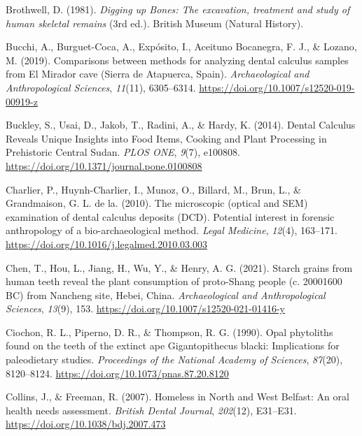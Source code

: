 \documentclass[
  b5paper,
]{book}
\newlength{\cslhangindent}
\newlength{\cslentryspacingunit} %
\newenvironment{CSLReferences}[2] %
 {%
  \setlength{\parindent}{0pt}
  \ifodd #1
  \let\oldpar\par
  \def\par{\hangindent=\cslhangindent\oldpar}
  \fi
  \setlength{\parskip}{#2\cslentryspacingunit}
 }%
 {}
\begin{document}
\begin{CSLReferences}{1}{0}
\leavevmode{}%
Brothwell, D. (1981). \emph{Digging up {Bones}: {The} excavation,
treatment and study of human skeletal remains} (3rd ed.). {British
Museum (Natural History)}.

\leavevmode{}%
Bucchi, A., Burguet-Coca, A., Expósito, I., Aceituno Bocanegra, F. J.,
\& Lozano, M. (2019). Comparisons between methods for analyzing dental
calculus samples from {El Mirador} cave ({Sierra} de {Atapuerca},
{Spain}). \emph{Archaeological and Anthropological Sciences},
\emph{11}(11), 6305--6314.
\url{https://doi.org/10.1007/s12520-019-00919-z}

\leavevmode{}%
Buckley, S., Usai, D., Jakob, T., Radini, A., \& Hardy, K. (2014).
Dental {Calculus Reveals Unique Insights} into {Food Items}, {Cooking}
and {Plant Processing} in {Prehistoric Central Sudan}. \emph{PLOS ONE},
\emph{9}(7), e100808. \url{https://doi.org/10.1371/journal.pone.0100808}

\leavevmode{}%
Charlier, P., Huynh-Charlier, I., Munoz, O., Billard, M., Brun, L., \&
Grandmaison, G. L. de la. (2010). The microscopic (optical and {SEM})
examination of dental calculus deposits ({DCD}). {Potential} interest in
forensic anthropology of a bio-archaeological method. \emph{Legal
Medicine}, \emph{12}(4), 163--171.
\url{https://doi.org/10.1016/j.legalmed.2010.03.003}

\leavevmode{}%
Chen, T., Hou, L., Jiang, H., Wu, Y., \& Henry, A. G. (2021). Starch
grains from human teeth reveal the plant consumption of proto-{Shang}
people (c. 2000{\textendash}1600 {BC}) from {Nancheng} site, {Hebei},
{China}. \emph{Archaeological and Anthropological Sciences},
\emph{13}(9), 153. \url{https://doi.org/10.1007/s12520-021-01416-y}

\leavevmode{}%
Ciochon, R. L., Piperno, D. R., \& Thompson, R. G. (1990). Opal
phytoliths found on the teeth of the extinct ape {Gigantopithecus}
blacki: Implications for paleodietary studies. \emph{Proceedings of the
National Academy of Sciences}, \emph{87}(20), 8120--8124.
\url{https://doi.org/10.1073/pnas.87.20.8120}

\leavevmode{}%
Collins, J., \& Freeman, R. (2007). Homeless in {North} and {West
Belfast}: An oral health needs assessment. \emph{British Dental
Journal}, \emph{202}(12), E31--E31.
\url{https://doi.org/10.1038/bdj.2007.473}


\end{CSLReferences}
\end{document}
